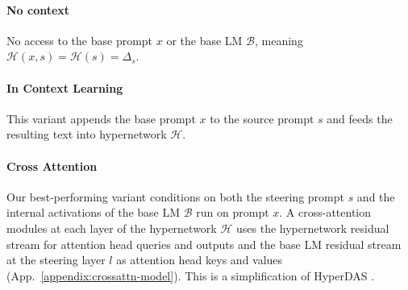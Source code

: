 \documentclass[11pt]{article}
\newcommand{\methodname}{\textsc{HyperSteer}}
\begin{document}
\paragraph{No context} No access to the base prompt $x$ or the base LM $\mathcal{B}$, meaning $\mathcal H({x},{s})=\mathcal{H}({s})=\Delta_s$.

\paragraph{In Context Learning} This variant appends the base prompt $x$ to the source prompt $s$ and feeds the resulting text into hypernetwork $\mathcal{H}$.

\paragraph{Cross Attention} Our best-performing variant conditions on both the steering prompt $s$ and the internal activations of the base LM $\mathcal{B}$ run on prompt $x$. A cross-attention modules at each layer of the hypernetwork $\mathcal H$ uses the hypernetwork residual stream for attention head queries and outputs and the base LM residual stream at the steering layer $l$ as attention head keys and values (App.~\ref{appendix:crossattn-model}). 
This is a simplification of HyperDAS \cite{sun2025hyperdas}.


\end{document}

